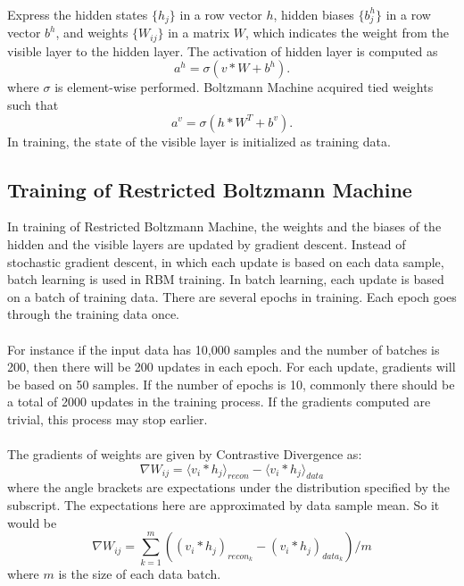 \documentclass[12pt]{article}
\begin{document}
\\
Express the hidden states $\{h_j\}$ in a row vector $h$, hidden biases $\{b^h_{j}\}$ in a row vector $b^ h$, and weights $\{W_{ij}\}$ in a matrix $W$, which indicates the weight from the visible layer to the hidden layer. The activation of hidden layer is computed as
\begin{equation}
a^h =\sigma(v * W + b^h).
\end{equation}
where $\sigma$ is element-wise performed. Boltzmann Machine acquired tied weights such that
\begin{equation}
a^v = \sigma(h * W^{T} + b^v).
\end{equation}
In training, the state of the visible layer is initialized as training data.
\subsection{Training of Restricted Boltzmann Machine}
In training of Restricted Boltzmann Machine, the weights and the biases of the hidden and the visible layers are updated by gradient descent. Instead of stochastic gradient descent, in which each update is based on each data sample, batch learning is used in RBM training. In batch learning, each update is based on a batch of training data. There are several epochs in training. Each epoch goes through the training data once.\\
\\
For instance if the input data has 10,000 samples and the number of batches is 200, then there will be 200 updates in each epoch.  For each update, gradients will be based on 50 samples. If the number of epochs is 10, commonly there should be a total of 2000 updates in the training process. If the gradients computed are trivial, this process may stop earlier.\\
\\
The gradients of weights are given by Contrastive Divergence as: \begin{equation}\label{eq:7}
\nabla W_{ij} = \langle v_i * h_j\rangle_{recon} - \langle v_i * h_j\rangle_{data}
\end{equation}
where the angle brackets are expectations under the distribution specified by the
subscript. The expectations here are approximated by data sample mean. So it would be 
\begin{equation}
\nabla W_{ij} = \sum_{k = 1} ^ {m}((v_i * h_j)_{recon_k} - (v_i * h_j)_{data_k}) / m
\end{equation}
where $m$ is the size of each data batch.\\
\end{document}
